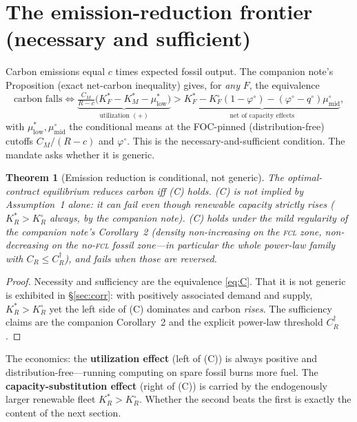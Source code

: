 \documentclass[11pt,reqno]{amsart}
\theoremstyle{plain}
\newtheorem{theorem}{Theorem}
\theoremstyle{definition}
\theoremstyle{remark}
\newcommand{\KRs}{K_R^{*}}\newcommand{\KFs}{K_F^{*}}\newcommand{\KMs}{K_M^{*}}
\newcommand{\KRo}{K_R^{\circ}}\newcommand{\KFo}{K_F^{\circ}}
\newcommand{\CM}{C_M}\newcommand{\CF}{C_F}\newcommand{\CR}{C_R}
\begin{document}
\section{The emission-reduction frontier (necessary and sufficient)}\label{sec:ns}

Carbon emissions equal $c$ times expected fossil output. The companion note's
Proposition (exact net-carbon inequality) gives, for \emph{any} $F$, the equivalence
\begin{equation}\label{eq:C}
  \text{carbon falls}
  \iff
  \underbrace{\tfrac{\CM}{R-c}\big(\KFs-\KMs-\mu^{*}_{\mathrm{low}}\big)}_{\text{utilization }(+)}
  >
  \underbrace{\KFs-\KFo(1-\varphi^{\circ})-(\varphi^{\circ}-q^{\circ})\mu^{\circ}_{\mathrm{mid}}}_{\text{net of capacity effects}},
  \tag{C}
\end{equation}
with $\mu^{*}_{\mathrm{low}},\mu^{\circ}_{\mathrm{mid}}$ the conditional means at
the FOC-pinned (distribution-free) cutoffs $\CM/(R-c)$ and $\varphi^{\circ}$. This
is the necessary-and-sufficient condition. The mandate asks whether it is generic.

\begin{theorem}[Emission reduction is conditional, not generic]\label{thm:ns}
The optimal-contract equilibrium reduces carbon \emph{iff} \textup{(C)} holds.
\textup{(C)} is \emph{not} implied by Assumption~1 alone: it can fail even though
renewable capacity strictly rises ($\KRs>\KRo$ always, by the companion note).
\textup{(C)} holds under the mild regularity of the companion note's
Corollary~2 (density non-increasing on the \textsc{fcl} zone, non-decreasing on
the no-\textsc{fcl} fossil zone---in particular the whole power-law family with
$\CR\le\CR^{\dagger}$), and fails when those are reversed.
\end{theorem}

\begin{proof}
Necessity and sufficiency are the equivalence \eqref{eq:C}. That it is not generic
is exhibited in \S\ref{sec:corr}: with positively associated demand and supply,
$\KRs>\KRo$ yet the left side of (C) dominates and carbon \emph{rises}. The
sufficiency claims are the companion Corollary~2 and the explicit power-law
threshold $\CR^{\dagger}$.
\end{proof}

The economics: the \textbf{utilization effect} (left of (C)) is always positive
and distribution-free---running computing on spare fossil burns more fuel. The
\textbf{capacity-substitution effect} (right of (C)) is carried by the
endogenously larger renewable fleet $\KRs>\KRo$. Whether the second beats the
first is exactly the content of the next section.
\end{document}
